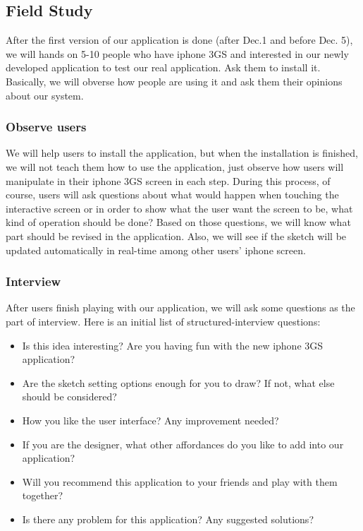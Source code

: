 \documentclass{article}
\begin{document}
\subsection{Field Study}
After the first version of our application is done (after Dec.1 and before Dec. 5), we will hands on 5-10 people who have iphone 3GS and interested in our newly developed application to test our real application. Ask them to install it. Basically, we will obverse how people are using it and ask them their opinions about our system.

\subsubsection{Observe users}
We will help users to install the application, but when the installation is finished, we will not teach them how to use the application, just observe how users will manipulate in their iphone 3GS screen in each step. During this process, of course, users will ask questions about what would happen when touching the interactive screen or in order to show what the user want the screen to be, what kind of operation should be done? Based on those questions, we will know what part should be revised in the application. Also, we will see if the sketch will be updated automatically in real-time among other users' iphone screen.

\subsubsection{Interview}

After users finish playing with our application, we will ask some questions as
the part of interview.  Here is an initial list of structured-interview
questions:
\begin{itemize}
\item Is this idea interesting? Are you having fun with the new iphone 3GS application?
\item Are the sketch setting options enough for you to draw? If not, what else should be considered?
\item How you like the user interface? Any improvement needed?
\item If you are the designer, what other affordances do you like to add into our application?
\item Will you recommend this application to your friends and play with them together?
\item Is there any problem for this application? Any suggested solutions?
\end{itemize}
 

 
\end{document}
